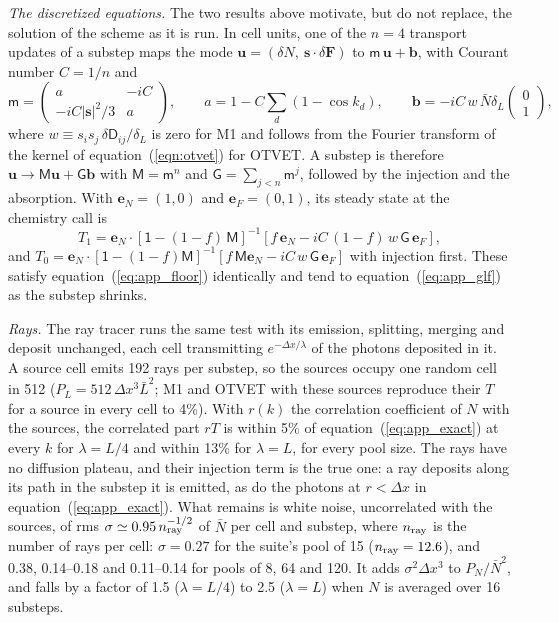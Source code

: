 \emph{The discretized equations.} The two results above motivate, but do not replace, the solution of the
scheme as it is run. In cell units, one of the $n=4$ transport updates of a substep maps the mode
$\mathbf u=(\delta N,\ \mathbf s\cdot\delta\mathbf F)$ to $\mathsf m\,\mathbf u+\mathbf b$, with Courant
number $C=1/n$ and
\begin{equation}
\mathsf m=\begin{pmatrix}a&-iC\\-iC|\mathbf s|^2/3&a\end{pmatrix},\qquad
a=1-C\sum_d(1-\cos k_d),\qquad
\mathbf b=-iC\,w\,\bar N\delta_L\begin{pmatrix}0\\1\end{pmatrix},
\end{equation}
where $w\equiv s_is_j\,\delta\mathsf D_{ij}/\delta_L$ is zero for M1 and follows from the Fourier transform
of the kernel of equation~(\ref{eqn:otvet}) for OTVET. A substep is therefore
$\mathbf u\to\mathsf M\mathbf u+\mathsf G\mathbf b$ with $\mathsf M=\mathsf m^n$ and
$\mathsf G=\sum_{j<n}\mathsf m^j$, followed by the injection and the absorption. With
$\mathbf e_N=(1,0)$ and $\mathbf e_F=(0,1)$, its steady state at the chemistry call is
\begin{equation}
T_1=\mathbf e_N\cdot\left[\mathsf 1-(1-f)\,\mathsf M\right]^{-1}
\left[f\,\mathbf e_N-iC\,(1-f)\,w\,\mathsf G\,\mathbf e_F\right],\label{eq:app_disc}
\end{equation}
and $T_0=\mathbf e_N\cdot[\mathsf 1-(1-f)\mathsf M]^{-1}[f\,\mathsf M\mathbf e_N-iC\,w\,\mathsf G\,\mathbf e_F]$
with injection first. These satisfy equation~(\ref{eq:app_floor}) identically and tend to
equation~(\ref{eq:app_glf}) as the substep shrinks.

\emph{Rays.} The ray tracer runs the same test with its emission, splitting, merging and deposit unchanged,
each cell transmitting $e^{-\Delta x/\lambda}$ of the photons deposited in it. A source cell emits 192 rays
per substep, so the sources occupy one random cell in 512 ($P_L=512\,\Delta x^3\bar L^2$; M1 and OTVET with
these sources reproduce their $T$ for a source in every cell to 4\%). With $r(k)$ the correlation
coefficient of $N$ with the sources, the correlated part $rT$ is within 5\% of
equation~(\ref{eq:app_exact}) at every $k$ for $\lambda=L/4$ and within 13\% for $\lambda=L$, for every
pool size. The rays have no diffusion plateau, and their injection term is the true one: a ray deposits
along its path in the substep it is emitted, as do the photons at $r<\Delta x$ in
equation~(\ref{eq:app_exact}). What remains is white noise, uncorrelated with the sources, of rms
$\sigma\simeq0.95\,n_{\rm ray}^{-1/2}$ of $\bar N$ per cell and substep, where $n_{\rm ray}$ is the number
of rays per cell: $\sigma=0.27$ for the suite's pool of 15 ($n_{\rm ray}=12.6$), and 0.38, 0.14--0.18 and
0.11--0.14 for pools of 8, 64 and 120. It adds $\sigma^2\Delta x^3$ to $P_N/\bar N^2$, and falls by a
factor of 1.5 ($\lambda=L/4$) to 2.5 ($\lambda=L$) when $N$ is averaged over 16 substeps.

